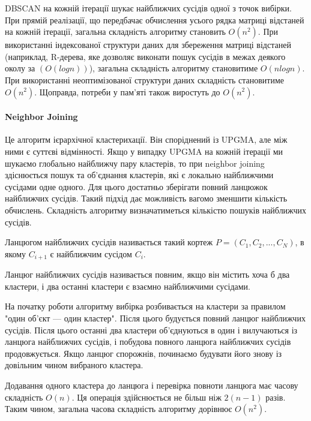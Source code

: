             DBSCAN на кожній ітерації шукає найближчих сусідів одної з точок вибірки. При прямій реалізації, що передбачає обчислення усього рядка матриці відстаней на кожній ітерації, загальна складність алгоритму становить $O(n^2)$. При використанні індексованої структури даних для збереження матриці відстаней (наприклад, R-дерева, яке дозволяє виконати пошук сусідів в межах деякого околу за $(O(log n))$), загальна складність алгоритму становитиме $O(n log n)$. При використанні неоптимізованої структури даних складність становитиме $O(n^2)$. Щоправда, потреби у пам'яті також виростуть до $O(n^2)$.
        
        \paragraph {Neighbor Joining}
            Це алгоритм ієрархічної кластерихації. Він споріднений із UPGMA, але між ними є суттєві відмінності. Якщо у випадку UPGMA на кожній ітерації ми шукаємо глобально найближчу пару кластерів, то при neighbor joining здіснюється пошук та об'єднання кластерів, які є локально найближчими сусідами одне одного. Для цього достатньо зберігати повний ланцюжок найближчих сусідів. Такий підхід дає можливість вагомо зменшити кількість обчислень. Складність алгоритму визначатиметься кількістю пошуків найближчих сусідів.
            
            \begin{definition}
                Ланцюгом найближчих сусідів називається такий кортеж $P = (C_1, C_2, ..., C_N)$, в якому $C_{i+1}$ є найближчим сусідом $C_i$.
            \end{definition}
            
            \begin{definition}
                Ланцюг найближчих сусідів називається повним, якщо він містить хоча б два кластери, і два останні кластери є взаємно найближчими сусідами.
            \end{definition}
            
            На початку роботи алгоритму вибірка розбивається на кластери за правилом "один об'єкт --- один кластер". Після цього будується повний ланцюг найближчих сусідів. Після цього останні два кластери об'єднуються в один і вилучаються із ланцюга найближчих сусідів, і побудова повного ланцюга найближчих сусідів продовжується. Якщо ланцюг спорожнів, починаємо будувати його знову із довільним чином вибраного кластера.
            
            Додавання одного кластера до ланцюга і перевірка повноти ланцюга має часову складність $O(n)$. Ця операція здійснюється не більш ніж $2(n-1)$ разів. Таким чином, загальна часова складність алгоритму дорівнює $O(n^2)$. 
            
